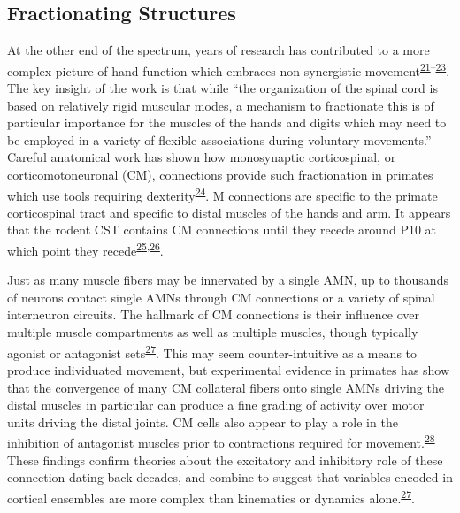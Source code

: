 \documentclass[
  a4paper,
]{article}
\begin{document}
\hypertarget{fractionating-structures}{%
\subsection{Fractionating Structures}\label{fractionating-structures}}

At the other end of the spectrum, years of research has contributed to a
more complex picture of hand function which embraces non-synergistic
movement\textsuperscript{\protect\hyperlink{ref-lemon1993}{21}--\protect\hyperlink{ref-lemon2008}{23}}.
The key insight of the work is that while ``the organization of the
spinal cord is based on relatively rigid muscular modes, a mechanism to
fractionate this is of particular importance for the muscles of the
hands and digits which may need to be employed in a variety of flexible
associations during voluntary movements.'' Careful anatomical work has
shown how monosynaptic corticospinal, or corticomotoneuronal (CM),
connections provide such fractionation in primates which use tools
requiring
dexterity\textsuperscript{\protect\hyperlink{ref-lemonStartingStoppingMovement2019}{24}}.
M connections are specific to the primate corticospinal tract and
specific to distal muscles of the hands and arm. It appears that the
rodent CST contains CM connections until they recede around P10 at which
point they
recede\textsuperscript{\protect\hyperlink{ref-kawasawa2017}{25},\protect\hyperlink{ref-murabe2018}{26}}.

Just as many muscle fibers may be innervated by a single AMN, up to
thousands of neurons contact single AMNs through CM connections or a
variety of spinal interneuron circuits. The hallmark of CM connections
is their influence over multiple muscle compartments as well as multiple
muscles, though typically agonist or antagonist
sets\textsuperscript{\protect\hyperlink{ref-cheneyFunctionalClassesPrimate1980}{27}}.
This may seem counter-intuitive as a means to produce individuated
movement, but experimental evidence in primates has show that the
convergence of many CM collateral fibers onto single AMNs driving the
distal muscles in particular can produce a fine grading of activity over
motor units driving the distal joints. CM cells also appear to play a
role in the inhibition of antagonist muscles prior to contractions
required for
movement.\textsuperscript{\protect\hyperlink{ref-griffinMotorCortexUses2020}{28}}
These findings confirm theories about the excitatory and inhibitory role
of these connection dating back decades, and combine to suggest that
variables encoded in cortical ensembles are more complex than kinematics
or dynamics
alone.\textsuperscript{\protect\hyperlink{ref-cheneyFunctionalClassesPrimate1980}{27}}.
\end{document}
